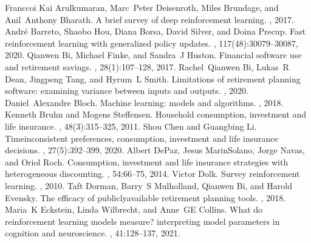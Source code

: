 \documentclass[letterpaper,10pt,english]{jupyterBook}
\begin{document}
\begin{sphinxthebibliography}{Franccoi}
\sphinxAtStartPar
Kai Arulkumaran, Marc Peter Deisenroth, Miles Brundage, and Anil Anthony Bharath. A brief survey of deep reinforcement learning. , 2017.
\sphinxAtStartPar
André Barreto, Shaobo Hou, Diana Borsa, David Silver, and Doina Precup. Fast reinforcement learning with generalized policy updates. , 117(48):30079–30087, 2020.
\sphinxAtStartPar
Qianwen Bi, Michael Finke, and Sandra J Huston. Financial software use and retirement savings. , 28(1):107–128, 2017.
\sphinxAtStartPar
Rachel Qianwen Bi, Lukas R Dean, Jingpeng Tang, and Hyrum L Smith. Limitations of retirement planning software: examining variance between inputs and outputs. , 2020.
\sphinxAtStartPar
Daniel Alexandre Bloch. Machine learning: models and algorithms. , 2018.
\sphinxAtStartPar
Kenneth Bruhn and Mogens Steffensen. Household consumption, investment and life insurance. , 48(3):315–325, 2011.
\sphinxAtStartPar
Shou Chen and Guangbing Li. Time\sphinxhyphen{}inconsistent preferences, consumption, investment and life insurance decisions. , 27(5):392–399, 2020.
\sphinxAtStartPar
Albert De\sphinxhyphen{}Paz, Jesus Marin\sphinxhyphen{}Solano, Jorge Navas, and Oriol Roch. Consumption, investment and life insurance strategies with heterogeneous discounting. , 54:66–75, 2014.
\sphinxAtStartPar
Victor Dolk. Survey reinforcement learning. , 2010.
\sphinxAtStartPar
Taft Dorman, Barry S Mulholland, Qianwen Bi, and Harold Evensky. The efficacy of publicly\sphinxhyphen{}available retirement planning tools. , 2018.
\sphinxAtStartPar
Maria K Eckstein, Linda Wilbrecht, and Anne GE Collins. What do reinforcement learning models measure? interpreting model parameters in cognition and neuroscience. , 41:128–137, 2021.

\end{sphinxthebibliography}
\end{document}
